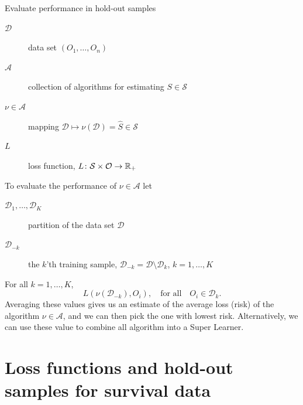 \documentclass[smaller]{beamer}\usepackage{listings}
\newcommand{\est}{\ensuremath{\nu}}
\begin{document}
\begin{frame}[label={sec:orgd464615}]{Evaluate performance in hold-out samples}
\small

\begin{description}
\item[{\(\mathcal{D}\)}] data set \((O_1, \dots, O_n)\)
\item[{\(\mathcal{A}\)}] collection of algorithms for estimating \(S \in \mathcal{S}\)
\item[{\(\nu \in \mathcal{A}\)}] mapping \(\mathcal{D} \longmapsto \est(\mathcal{D}) = \hat S \in
  \mathcal{S}\)
\item[{\(L\)}] loss function, \(L \colon \mathcal{S} \times \mathcal{O} \rightarrow \mathbb{R}_+\)
\end{description}

\vfill
To evaluate the performance of \(\est \in \mathcal{A}\) let
\begin{description}
\item[{\(\mathcal{D}_1, \dots, \mathcal{D}_K\)}] partition of the data set \(\mathcal{D}\)
\item[{\(\mathcal{D}_{-k}\)}] the \(k\)'th training sample, \(\mathcal{D}_{-k} = \mathcal{D} \setminus
  \mathcal{D}_{k}\), \(k=1, \dots, K\)
\end{description}

\vfill For all \(k =1, \dots, K\),
\begin{equation*}
L(\est(\mathcal{D}_{-k}), O_i),
\quad \text{for all} \quad O_i \in \mathcal{D}_k.
\end{equation*}
Averaging these values gives us an estimate of the average loss (risk) of the algorithm \(\nu \in
\mathcal{A}\), and we can then pick the one with lowest risk. Alternatively, we can use these value
to combine all algorithm into a Super Learner.
\end{frame}


\section{Loss functions and hold-out samples for survival data}
\label{sec:org4bc27b9}
\end{document}
